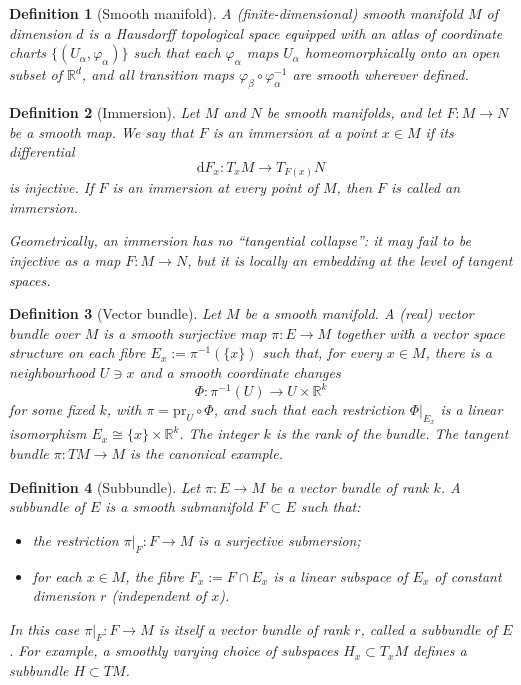 \documentclass[11pt]{article}
\newtheorem{definition}{Definition}
\begin{document}
\begin{definition}[Smooth manifold]
A (finite-dimensional) \emph{smooth manifold} $M$ of dimension $d$ is a
Hausdorff topological space equipped with an atlas of coordinate charts
$\{(U_\alpha,\varphi_\alpha)\}$ such that each $\varphi_\alpha$ maps
$U_\alpha$ homeomorphically onto an open subset of $\mathbb{R}^d$, and
all transition maps
$\varphi_\beta\circ\varphi_\alpha^{-1}$ are smooth wherever defined.
\end{definition}

\begin{definition}[Immersion]
Let $M$ and $N$ be smooth manifolds, and let $F : M \to N$ be a smooth map.
We say that $F$ is an \emph{immersion at a point} $x \in M$ if its differential
\[
  \mathrm dF_x : T_x M \longrightarrow T_{F(x)} N
\]
is injective. If $F$ is an immersion at every point of $M$, then $F$ is called
an \emph{immersion}.

Geometrically, an immersion has no ``tangential collapse'': it may fail to be
injective as a map $F:M\to N$, but it is locally an embedding at the level of
tangent spaces.
\end{definition}

\begin{definition}[Vector bundle]
Let $M$ be a smooth manifold. A (real) \emph{vector bundle} over $M$ is a
smooth surjective map $\pi : E \to M$ together with a vector space structure
on each fibre $E_x := \pi^{-1}(\{x\})$ such that, for every $x \in M$, there is
a neighbourhood $U \ni x$ and a smooth coordinate changes
\[
  \Phi : \pi^{-1}(U) \longrightarrow U \times \mathbb{R}^k
\]
for some fixed $k$, with $\pi = \mathrm{pr}_U \circ \Phi$, and such that each
restriction $\Phi|_{E_x}$ is a linear isomorphism $E_x \cong \{x\}\times\mathbb{R}^k$.
The integer $k$ is the \emph{rank} of the bundle. The tangent bundle
$\pi:TM\to M$ is the canonical example.
\end{definition}

\begin{definition}[Subbundle]
Let $\pi:E\to M$ be a vector bundle of rank $k$. A \emph{subbundle} of $E$ is
a smooth submanifold $F \subset E$ such that:
\begin{itemize}[leftmargin=1.5em]
  \item the restriction $\pi|_F : F \to M$ is a surjective submersion;
  \item for each $x\in M$, the fibre $F_x := F\cap E_x$ is a linear subspace
  of $E_x$ of constant dimension $r$ (independent of $x$).
\end{itemize}
In this case $\pi|_F : F\to M$ is itself a vector bundle of rank $r$, called a
subbundle of $E$. For example, a smoothly varying choice of subspaces
$H_x \subset T_x M$ defines a subbundle $H \subset TM$.
\end{definition}
\end{document}
